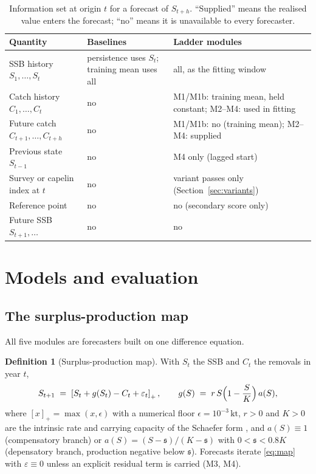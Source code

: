 \documentclass[preprint,11pt,authoryear]{elsarticle}
\theoremstyle{definition}
\newtheorem{definition}{Definition}
\theoremstyle{remark}
\newcommand{\kt}{\,\mathrm{kt}}
\newcommand{\Spos}[1]{\left[#1\right]_{+}}
\newcommand{\sA}{\mathfrak{s}}
\begin{document}
\begin{table}[!htb]
\centering\small
\caption{Information set at origin $t$ for a forecast of $S_{t+h}$. ``Supplied'' means the realised value enters the forecast; ``no'' means it is unavailable to every forecaster.}
\label{tab:infoset}
\begin{tabularx}{\textwidth}{@{}>{\raggedright\arraybackslash}p{}LL@{}}
\toprule
Quantity & Baselines & Ladder modules \\
\midrule
SSB history $S_1,\dots,S_t$ & persistence uses $S_t$; training mean uses all & all, as the fitting window \\
Catch history $C_1,\dots,C_t$ & no & M1/M1b: training mean, held constant; M2--M4: used in fitting \\
Future catch $C_{t+1},\dots,C_{t+h}$ & no & M1/M1b: no (training mean); M2--M4: supplied \\
Previous state $S_{t-1}$ & no & M4 only (lagged start) \\
Survey or capelin index at $t$ & no & variant passes only (Section~\ref{sec:variants}) \\
Reference point & no & no (secondary score only) \\
Future SSB $S_{t+1},\dots$ & no & no \\
\bottomrule
\end{tabularx}
\end{table}
\section{Models and evaluation}\label{sec:methods}

\subsection{The surplus-production map}\label{sec:map}

All five modules are forecasters built on one difference equation.

\begin{definition}[Surplus-production map]\label{def:map}
With $S_t$ the SSB and $C_t$ the removals in year $t$,
\begin{equation}\label{eq:map}
S_{t+1} \;=\; \Spos{S_t + g(S_t) - C_t + \varepsilon_t}, \qquad
g(S) \;=\; r\,S\Bigl(1-\frac{S}{K}\Bigr)\,a(S),
\end{equation}
where $[x]_+ = \max(x,\epsilon)$ with a numerical floor $\epsilon = 10^{-3}\kt$, $r>0$ and $K>0$ are the intrinsic rate and carrying capacity of the Schaefer form \citep{Schaefer1954,Pella1969}, and $a(S)\equiv 1$ (compensatory branch) or $a(S) = (S-\sA)/(K-\sA)$ with $0<\sA<0.8K$ (depensatory branch, production negative below $\sA$). Forecasts iterate \eqref{eq:map} with $\varepsilon\equiv 0$ unless an explicit residual term is carried (M3, M4).
\end{definition}
\end{document}
